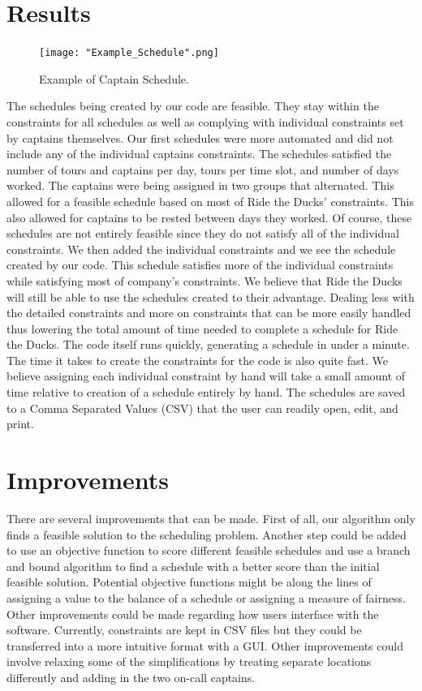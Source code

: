 \documentclass[12pt]{article}
\begin{document}
\section*{Results} 

\begin{figure}[h!]
\centering
\texttt{[image: "Example\_Schedule".png]}
\caption{Example of Captain Schedule.}
\end{figure}
\noindent The schedules being created by our code are feasible. They stay within the constraints for all schedules as well as complying with individual constraints set by captains themselves. Our first schedules were more automated and did not include any of the individual captains constraints. The schedules satisfied the number of tours and captains per day, tours per time slot, and number of days worked. The captains were being assigned in two groups that alternated. This allowed for a feasible schedule based on most of Ride the Ducks' constraints. This also allowed for captains to be rested between days they worked. Of course, these schedules are not entirely feasible since they do not satisfy all of the individual constraints. We then added the individual constraints and we see the schedule created by our code.  This schedule satisfies more of the individual constraints while satisfying most of company's constraints. We believe that Ride the Ducks will still be able to use the schedules created to their advantage. Dealing less with the detailed constraints and more on constraints that can be more easily handled thus lowering the total amount of time needed to complete a schedule for Ride the Ducks. The code itself runs quickly, generating a schedule in under a minute. The time it takes to create the constraints for the code is also quite fast. We believe assigning each individual constraint by hand will take a small amount of time relative to creation of a schedule entirely by hand. The schedules are saved to a Comma Separated Values (CSV) that the user can readily open, edit, and print. 


\section*{Improvements}
There are several improvements that can be made. First of all, our algorithm only finds a feasible solution to the scheduling problem. Another step could be added to use an objective function to score different feasible schedules and use a branch and bound algorithm to find a schedule with a better score than the initial feasible solution. Potential objective functions might be along the lines of assigning a value to the balance of a schedule or assigning a measure of fairness. Other improvements could be made regarding how users interface with the software. Currently, constraints are kept in CSV files but they could be transferred into a more intuitive format with a GUI. Other improvements could involve relaxing some of the simplifications by treating separate locations differently and adding in the two on-call captains. 
\end{document}

